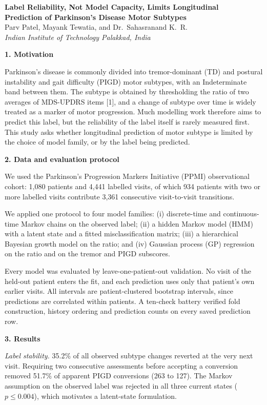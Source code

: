 \documentclass[10pt,a4paper]{article}
\newcommand{\sect}[1]{\vspace{0.25em}\noindent\textbf{#1}\par\nobreak\vspace{-0.15em}}
\begin{document}
\begin{center}
{\large\bfseries Label Reliability, Not Model Capacity, Limits Longitudinal\\
Prediction of Parkinson's Disease Motor Subtypes}\\[0.6em]
Parv Patel, Mayank Tewatia, and Dr.\ Sahasranand K.~R.\\[0.2em]
\emph{Indian Institute of Technology Palakkad, India}
\end{center}
\vspace{0.3em}

\sect{1. Motivation}
Parkinson's disease is commonly divided into tremor-dominant (TD) and postural
instability and gait difficulty (PIGD) motor subtypes, with an Indeterminate band
between them. The subtype is obtained by thresholding the ratio of two averages of
MDS-UPDRS items [1], and a change of subtype over time is widely treated as a marker
of motor progression. Much modelling work therefore aims to predict this label, but
the reliability of the label itself is rarely measured first. This study asks whether
longitudinal prediction of motor subtype is limited by the choice of model family, or
by the label being predicted.

\sect{2. Data and evaluation protocol}
We used the Parkinson's Progression Markers Initiative (PPMI) observational cohort:
1,080 patients and 4,441 labelled visits, of which 934 patients with two or more
labelled visits contribute 3,361 consecutive visit-to-visit transitions.

We applied one protocol to four model families: (i) discrete-time and continuous-time
Markov chains on the observed label; (ii) a hidden Markov model (HMM) with a latent
state and a fitted misclassification matrix; (iii) a hierarchical Bayesian growth
model on the ratio; and (iv) Gaussian process (GP) regression on the ratio and on the
tremor and PIGD subscores.

Every model was evaluated by leave-one-patient-out validation. No visit of the
held-out patient enters the fit, and each prediction uses only that patient's own
earlier visits. All intervals are patient-clustered bootstrap intervals, since
predictions are correlated within patients. A ten-check battery verified fold
construction, history ordering and prediction counts on every saved prediction row.

\sect{3. Results}
\emph{Label stability.} 35.2\% of all observed subtype changes reverted at the very
next visit. Requiring two consecutive assessments before accepting a conversion
removed 51.7\% of apparent PIGD conversions (263 to 127). The Markov assumption on the
observed label was rejected in all three current states ($p \le 0.004$), which
motivates a latent-state formulation.
\end{document}
